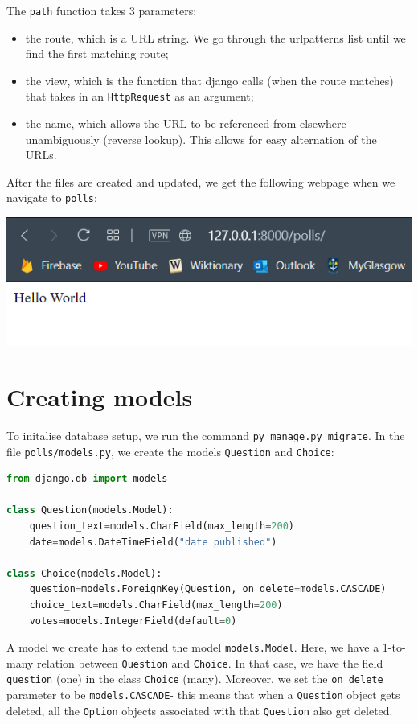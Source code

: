 \documentclass[a4paper, openany]{memoir}
\begin{document}
    The \texttt{path} function takes 3 parameters:
    \begin{itemize}
        \item the route, which is a URL string. We go through the urlpatterns list until we find the first matching route;
        \item the view, which is the function that django calls (when the route matches) that takes in an \texttt{HttpRequest} as an argument;
        \item the name, which allows the URL to be referenced from elsewhere unambiguously (reverse lookup). This allows for easy alternation of the URLs.
    \end{itemize}
    After the files are created and updated, we get the following webpage when we navigate to \texttt{polls}:
    \begin{center}
        \includegraphics[scale=0.8]{src/Django2.PNG}
    \end{center}
    \newpage

    \section{Creating models}
    To initalise database setup, we run the command \texttt{py manage.py migrate}. In the file \texttt{polls/models.py}, we create the models \texttt{Question} and \texttt{Choice}:
\begin{lstlisting}[language=python]
from django.db import models

class Question(models.Model):
    question_text=models.CharField(max_length=200)
    date=models.DateTimeField("date published")

class Choice(models.Model):
    question=models.ForeignKey(Question, on_delete=models.CASCADE)
    choice_text=models.CharField(max_length=200)
    votes=models.IntegerField(default=0)
\end{lstlisting}
    A model we create has to extend the model \texttt{models.Model}. 
    Here, we have a 1-to-many relation between \texttt{Question} and \texttt{Choice}. In that case, we have the field \texttt{question} (one) in the class \texttt{Choice} (many). Moreover, we set the \texttt{on\_delete} parameter to be \texttt{models.CASCADE}- this means that when a \texttt{Question} object gets deleted, all the \texttt{Option} objects associated with that \texttt{Question} also get deleted.
\end{document}
